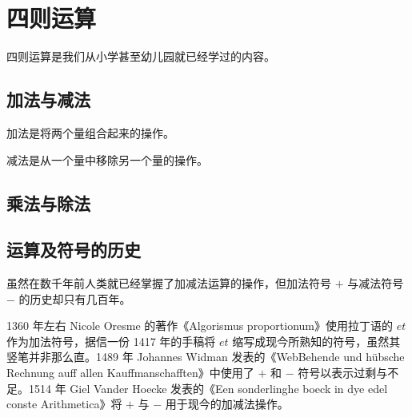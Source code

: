 \section{四则运算}\label{sec:Calculations/ElementaryArithmetic}
    四则运算是我们从小学甚至幼儿园就已经学过的内容。

    \subsection{加法与减法}\label{subsec:Calculations/ElementaryArithmetic/AdditionAndSubtraction}
        加法是将两个量组合起来的操作。

        减法是从一个量中移除另一个量的操作。

    \subsection{乘法与除法}\label{subsec:Calculations/ElementaryArithmetic/MultiplicationAndDivision}

    \subsection{运算及符号的历史}\label{subsec:Calculations/ElementaryArithmetic/HistoryOfSymbol}
        虽然在数千年前人类就已经掌握了加减法运算的操作，但加法符号 $+$ 与减法符号 $-$ 的历史却只有几百年。

        \begin{displayquote}
            1360 年左右 Nicole Oresme 的著作《Algorismus proportionum》使用拉丁语的 $et$ 作为加法符号，据信一份 1417 年的手稿将 $et$ 缩写成现今所熟知的符号，虽然其竖笔并非那么直。1489 年 Johannes Widman 发表的《WebBehende und hübsche Rechnung auff allen Kauffmanschafften》中使用了 $+$ 和 $-$ 符号以表示过剩与不足。1514 年 Giel Vander Hoecke 发表的《Een sonderlinghe boeck in dye edel conste Arithmetica》将 $+$ 与 $-$ 用于现今的加减法操作。
        \end{displayquote}
